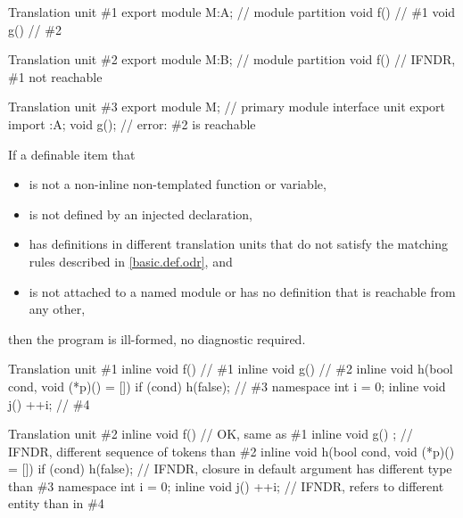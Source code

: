 \pnum
\begin{example}
\begin{codeblocktu}{Translation unit \#1}
export module M:A;  // module partition
void f() {}         // \#1
void g() {}         // \#2
\end{codeblocktu}
\begin{codeblocktu}{Translation unit \#2}
export module M:B;  // module partition
void f() {}         // IFNDR, \#1 not reachable
\end{codeblocktu}
\begin{codeblocktu}{Translation unit \#3}
export module M;    // primary module interface unit
export import :A;
void g();           // error: \#2 is reachable
\end{codeblocktu}
\end{example}


\pnum
If a definable item 
that
\begin{itemize}
\item
is not a non-inline non-templated function or variable,
\item
is not defined by an injected declaration,
\item
has definitions in different translation units
that do not satisfy
the matching rules described in \ref{basic.def.odr}, and
\item
is not attached to a named module or
has no definition that is reachable from any other,
\end{itemize}
then the program is ill-formed, no diagnostic required.

\pnum
\begin{example}
\begin{codeblocktu}{Translation unit \#1}
inline void f() {}          // \#1
inline void g() {}          // \#2
inline void h(bool cond, void (*p)() = []{}) {
  if (cond) h(false);
}                           // \#3
namespace { int i = 0; }
inline void j() {++i;}      // \#4
\end{codeblocktu}
\begin{codeblocktu}{Translation unit \#2}
inline void f() {}          // OK, same as \#1
inline void g() {;}         // IFNDR, different sequence of tokens than \#2
inline void h(bool cond, void (*p)() = []{}) {
  if (cond) h(false);
}                           // IFNDR, closure in default argument has different type than \#3
namespace { int i = 0; }
inline void j() {++i; }     // IFNDR,  refers to different entity than in \#4
\end{codeblocktu}
\end{example}

